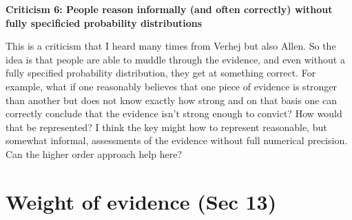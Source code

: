\documentclass[
  10pt,
  dvipsnames,enabledeprecatedfontcommands]{scrartcl}
\begin{document}
\textbf{Criticism 6: People reason informally (and often correctly) without fully specificied probability distributions}

This is a criticism that I heard many times from Verhej but also Allen.
So the idea is that people are able to muddle through the evidence, and
even without a fully specified probability distribution, they get at
something correct. For example, what if one reasonably believes that one
piece of evidence is stronger than another but does not know exactly how
strong and on that basis one can correctly conclude that the evidence
isn't strong enough to convict? How would that be represented? I think
the key might how to represent reasonable, but somewhat informal,
assessments of the evidence without full numerical precision. Can the
higher order approach help here?

\hypertarget{weight-of-evidence-sec-13}{%
\section{Weight of evidence (Sec 13)}\label{weight-of-evidence-sec-13}}
\end{document}

